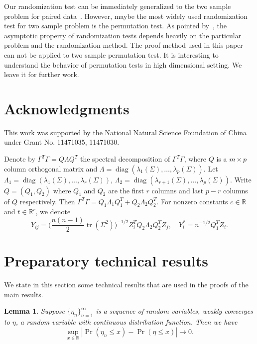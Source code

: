 \documentclass[3p]{elsarticle}
\DeclareMathOperator{\mytr}{tr}
\DeclareMathOperator{\mydiag}{diag}
\theoremstyle{plain}
\newtheorem{lemma}{Lemma}
\theoremstyle{definition}
\theoremstyle{remark}
\begin{document}
Our randomization test can be immediately generalized to the two sample problem for paired data~\citep{Konietschke2014}.
However, maybe the most widely used randomization test for two sample problem is the permutation test.
As pointed by~\citet{Romano1990On}, the asymptotic property of randomization tests depends heavily on the particular problem and the randomization method.
The proof method used in this paper can not be applied to two sample permutation test.
 It is interesting to understand the behavior of permutation tests in high dimensional setting. We leave it for further work.


\section*{Acknowledgments}
{This work was supported by the National Natural Science Foundation of China under Grant No. 11471035, 11471030.
}

\appendix
\appendixpage
    
    Denote by $\Gamma^T \Gamma= Q\Lambda Q^T$ the spectral decomposition of $\Gamma^T \Gamma$, where  $Q$ is a $m\times p$ column orthogonal matrix and $\Lambda=\mydiag(\lambda_1(\Sigma),\ldots,\lambda_p(\Sigma))$.
    Let $\Lambda_{1}=\mydiag(\lambda_1(\Sigma),\ldots,\lambda_r(\Sigma))$, $\Lambda_{2}=\mydiag(\lambda_{r+1}(\Sigma),\ldots,\lambda_p(\Sigma))$.
    Write $Q=(Q_{1},Q_{2})$ where $Q_{1}$ and $Q_{2}$ are the first $r$ columns and last $p-r$ columns of $Q$ respectively.
    Then $\Gamma^T \Gamma=Q_1\Lambda_1 Q_1^T + Q_2 \Lambda_2 Q_2^T$.
For nonzero constants $c\in\mathbb{R}$ and $t\in\mathbb{R}^r$, we denote
$$
    Y_{ij}=\big(\frac{n(n-1)}{2} \mytr(\Sigma^2)\big)^{-1/2}Z_i^T Q_2 \Lambda_2 Q_2^T Z_j,
    \quad
    Y^*_i=n^{-1/2} Q_1^T Z_i.
$$

\section{Preparatory technical results}
We state in this section some technical results that are used in the proofs of the main results.

\begin{lemma}\label{lemmaUniformSimple}
    Suppose $\{\eta_n\}_{n=1}^{\infty}$ is a sequence of random variables, weakly converges to $\eta$, a random variable with continuous distribution function.
    Then we have
    \begin{equation*}
        \sup_{x\in\mathbb{R}}|\Pr(\eta_n\leq x)-\Pr(\eta\leq x)|\to 0.
    \end{equation*}
\end{lemma}
\end{document}
